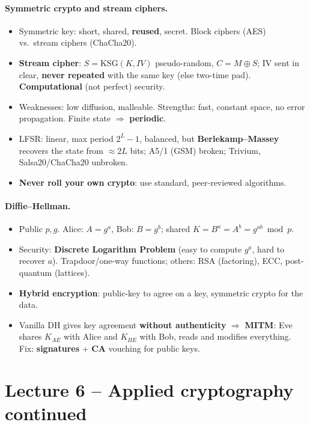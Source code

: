 \paragraph{Symmetric crypto and stream ciphers.}
\begin{itemize}
    \item Symmetric key: short, shared, \textbf{reused}, secret. Block ciphers (AES) vs.\ stream ciphers (ChaCha20).
    \item \textbf{Stream cipher}: $S = \mathrm{KSG}(K, IV)$ pseudo-random, $C = M \oplus S$; IV sent in clear, \textbf{never repeated} with the same key (else two-time pad). \textbf{Computational} (not perfect) security.
    \item Weaknesses: low diffusion, malleable. Strengths: fast, constant space, no error propagation. Finite state $\Rightarrow$ \textbf{periodic}.
    \item LFSR: linear, max period $2^L - 1$, balanced, but \textbf{Berlekamp--Massey} recovers the state from $\approx 2L$ bits; A5/1 (GSM) broken; Trivium, Salsa20/ChaCha20 unbroken.
    \item \textbf{Never roll your own crypto}: use standard, peer-reviewed algorithms.
\end{itemize}

\paragraph{Diffie--Hellman.}
\begin{itemize}
    \item Public $p, g$. Alice: $A = g^a$, Bob: $B = g^b$; shared $K = B^a = A^b = g^{ab} \bmod p$.
    \item Security: \textbf{Discrete Logarithm Problem} (easy to compute $g^a$, hard to recover $a$). Trapdoor/one-way functions; others: RSA (factoring), ECC, post-quantum (lattices).
    \item \textbf{Hybrid encryption}: public-key to agree on a key, symmetric crypto for the data.
    \item Vanilla DH gives key agreement \textbf{without authenticity} $\Rightarrow$ \textbf{MITM}: Eve shares $K_{AE}$ with Alice and $K_{BE}$ with Bob, reads and modifies everything. Fix: \textbf{signatures} + \textbf{CA} vouching for public keys.
\end{itemize}

\section{Lecture 6 -- Applied cryptography continued}

